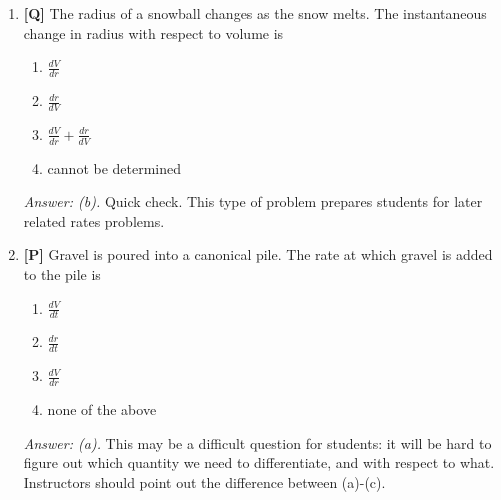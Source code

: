 \documentclass[12pt]{article}
\begin{document}
\begin{enumerate}
As you change the size of the angle $\theta$, you change the area of the slice, $A=\frac{1}{2}r^2\theta$. Then $A^{\prime}$ is

\begin{enumerate}
\item $r\theta$
\item $\frac{1}{2}r^2$
\item not possible to determine from the given information
\end{enumerate}

{\it Answer: (b).} The area of the slice of pizza varies as the angle $\theta$ varies. The slice of pizza has area $A(\theta)=\frac{1}{2}r^2\theta$. Hence $A^{\prime}(\theta)=\frac{1}{2}r^2$. Students should pay attention to the variable with respect to which they differentiate. Instructors may want to encourage their students to use the limit definition of the derivative in this problem.

\item {\bf [Q]} The radius of a snowball changes as the snow melts. The instantaneous change in radius 
with respect to volume is
\begin {enumerate}
\item $\displaystyle {\frac{dV}{dr}}$
\item $\displaystyle {\frac{dr}{dV}}$
\item $\displaystyle {\frac{dV}{dr}+\frac{dr}{dV}}$
\item cannot be determined
\end{enumerate}

{\it Answer: (b).} Quick check. This type of problem prepares students for later related rates problems.

\item {\bf [P]} Gravel is poured into a canonical pile. The rate at which gravel is added to the pile is
\begin {enumerate}
\item $\displaystyle{\frac{dV}{dt}}$
\item $\displaystyle{\frac{dr}{dt}}$
\item $\displaystyle{\frac{dV}{dr}}$
\item none of the above
\end{enumerate}

{\it Answer: (a).} This may be a difficult question for students: it will be hard to figure out 
which quantity we need to differentiate, and with respect to what. Instructors should point out the 
difference between (a)-(c).


\end{enumerate}
\end{document}
